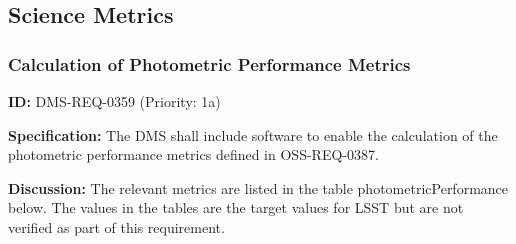 \documentclass[SE,toc,lsstdraft]{lsstdoc}
\begin{document}
\subsection{Science Metrics}

\subsubsection{Calculation of Photometric Performance Metrics}

\label{DMS-REQ-0359}
\textbf{ID:} DMS-REQ-0359 (Priority: 1a)

\textbf{Specification:}
The DMS shall include software to enable the calculation of the photometric performance metrics defined in OSS-REQ-0387.

\textbf{Discussion:}
The relevant metrics are listed in the table photometricPerformance below. The values in the tables are the target values for LSST but are not verified as part of this requirement.
\end{document}
